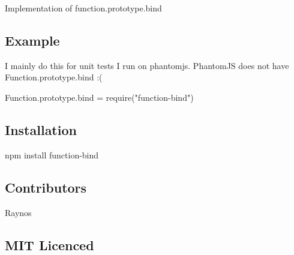 Implementation of function.\+prototype.\+bind

\subsection*{Example}

I mainly do this for unit tests I run on phantomjs. Phantom\+JS does not have Function.\+prototype.\+bind \+:(


\begin{DoxyCode}
Function.prototype.bind = require("function-bind")
\end{DoxyCode}


\subsection*{Installation}

{\ttfamily npm install function-\/bind}

\subsection*{Contributors}


\begin{DoxyItemize}
\item Raynos
\end{DoxyItemize}

\subsection*{M\+IT Licenced}
